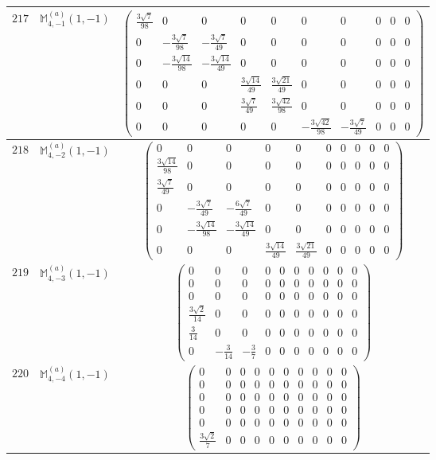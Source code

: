 \documentclass[fleqn,8pt,landscape]{jsarticle}
\begin{document}
\begin{center}
\begin{longtable}{ccc}
$ 217 $ & $ \mathbb{M}_{4,-1}^{(a)}(1,-1) $ & $ \begin{pmatrix} \frac{3 \sqrt{7}}{98} & 0 & 0 & 0 & 0 & 0 & 0 & 0 & 0 & 0 \\ 0 & - \frac{3 \sqrt{7}}{98} & - \frac{3 \sqrt{7}}{49} & 0 & 0 & 0 & 0 & 0 & 0 & 0 \\ 0 & - \frac{3 \sqrt{14}}{98} & - \frac{3 \sqrt{14}}{49} & 0 & 0 & 0 & 0 & 0 & 0 & 0 \\ 0 & 0 & 0 & \frac{3 \sqrt{14}}{49} & \frac{3 \sqrt{21}}{49} & 0 & 0 & 0 & 0 & 0 \\ 0 & 0 & 0 & \frac{3 \sqrt{7}}{49} & \frac{3 \sqrt{42}}{98} & 0 & 0 & 0 & 0 & 0 \\ 0 & 0 & 0 & 0 & 0 & - \frac{3 \sqrt{42}}{98} & - \frac{3 \sqrt{7}}{49} & 0 & 0 & 0 \end{pmatrix} $ \\ \hline
$ 218 $ & $ \mathbb{M}_{4,-2}^{(a)}(1,-1) $ & $ \begin{pmatrix} 0 & 0 & 0 & 0 & 0 & 0 & 0 & 0 & 0 & 0 \\ \frac{3 \sqrt{14}}{98} & 0 & 0 & 0 & 0 & 0 & 0 & 0 & 0 & 0 \\ \frac{3 \sqrt{7}}{49} & 0 & 0 & 0 & 0 & 0 & 0 & 0 & 0 & 0 \\ 0 & - \frac{3 \sqrt{7}}{49} & - \frac{6 \sqrt{7}}{49} & 0 & 0 & 0 & 0 & 0 & 0 & 0 \\ 0 & - \frac{3 \sqrt{14}}{98} & - \frac{3 \sqrt{14}}{49} & 0 & 0 & 0 & 0 & 0 & 0 & 0 \\ 0 & 0 & 0 & \frac{3 \sqrt{14}}{49} & \frac{3 \sqrt{21}}{49} & 0 & 0 & 0 & 0 & 0 \end{pmatrix} $ \\ \hline
$ 219 $ & $ \mathbb{M}_{4,-3}^{(a)}(1,-1) $ & $ \begin{pmatrix} 0 & 0 & 0 & 0 & 0 & 0 & 0 & 0 & 0 & 0 \\ 0 & 0 & 0 & 0 & 0 & 0 & 0 & 0 & 0 & 0 \\ 0 & 0 & 0 & 0 & 0 & 0 & 0 & 0 & 0 & 0 \\ \frac{3 \sqrt{2}}{14} & 0 & 0 & 0 & 0 & 0 & 0 & 0 & 0 & 0 \\ \frac{3}{14} & 0 & 0 & 0 & 0 & 0 & 0 & 0 & 0 & 0 \\ 0 & - \frac{3}{14} & - \frac{3}{7} & 0 & 0 & 0 & 0 & 0 & 0 & 0 \end{pmatrix} $ \\ \hline
$ 220 $ & $ \mathbb{M}_{4,-4}^{(a)}(1,-1) $ & $ \begin{pmatrix} 0 & 0 & 0 & 0 & 0 & 0 & 0 & 0 & 0 & 0 \\ 0 & 0 & 0 & 0 & 0 & 0 & 0 & 0 & 0 & 0 \\ 0 & 0 & 0 & 0 & 0 & 0 & 0 & 0 & 0 & 0 \\ 0 & 0 & 0 & 0 & 0 & 0 & 0 & 0 & 0 & 0 \\ 0 & 0 & 0 & 0 & 0 & 0 & 0 & 0 & 0 & 0 \\ \frac{3 \sqrt{2}}{7} & 0 & 0 & 0 & 0 & 0 & 0 & 0 & 0 & 0 \end{pmatrix} $ \\ \hline

\end{longtable}
\end{center}
\end{document}
